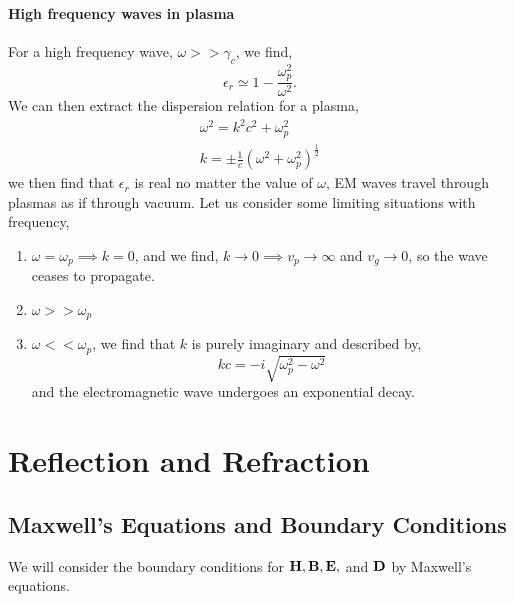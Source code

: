\documentclass{book}
\begin{document}
\subsubsection{High frequency waves in plasma}
For a high frequency wave, $\omega >> \gamma_c$, we find,
\begin{equation}
	\epsilon_r \simeq 1 - \frac{\omega_p^2}{\omega^2}.
\end{equation}
We can then extract the dispersion relation for a plasma,
\begin{align}
	\omega^2 = k^2c^2 + \omega_p^2\\
	k = \pm\frac{1}{c}\left(\omega^2 + \omega_p^2\right)^{\frac{1}{2}}
\end{align}
we then find that $\epsilon_r$ is real no matter the value of $\omega$, EM waves travel through plasmas as if through vacuum. Let us consider some limiting situations with frequency,
\begin{enumerate}
	\item $\omega = \omega_p \implies k = 0$, and we find, $k \to 0 \implies v_p \to \infty$ and $v_g \to 0$, so the wave ceases to propagate.
	\item $\omega >> \omega_p$
	\item $\omega << \omega_p$, we find that $k$ is purely imaginary and described by,
	\begin{equation}
		kc = -i\sqrt{\omega_p^2 -\omega^2}
	\end{equation}
	and the electromagnetic wave undergoes an exponential decay.
\end{enumerate}
\chapter{Reflection and Refraction}
\section{Maxwell's Equations and Boundary Conditions}
We will consider the boundary conditions for $\vb{H}, \vb{B}, \vb{E},$ and $\vb{D}$  by Maxwell's equations.
\end{document}
